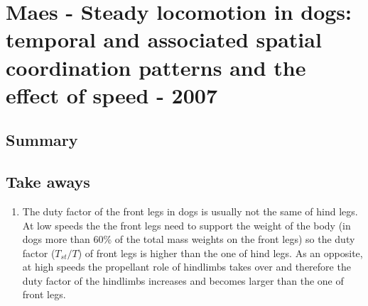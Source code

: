 \section{Maes - Steady locomotion in dogs: temporal and associated spatial coordination patterns and the effect of speed - 2007}

\subsection*{Summary}
\subsection*{Take aways}

\begin{enumerate}
\item The duty factor of the front legs in dogs is usually not the same of hind legs. At low speeds the the front legs need to support the weight of the body (in dogs more than 60\% of the total mass weights on the front legs) so the duty factor ($T_{st}/T$) of front legs is higher than the one of hind legs. As an opposite, at high speeds the propellant role of hindlimbs takes over and therefore the duty factor of the hindlimbs increases and becomes larger than the one of front legs.
\end{enumerate}